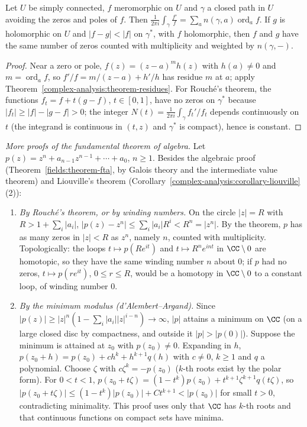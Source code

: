 \begin{theorem}\label{complex-analysis:theorem-argument-principle}
Let $U$ be simply connected, $f$ meromorphic on $U$ and $\gamma$ a closed path in $U$ avoiding the zeros and poles of $f$. Then
$\frac{1}{2\pi i}\int_\gamma\frac{f'}{f} = \sum_a n(\gamma, a)\operatorname{ord}_af$. If $g$ is holomorphic on $U$ and $|f - g| < |f|$ on $\gamma^*$, with $f$ holomorphic, then $f$ and $g$ have the same number of
zeros counted with multiplicity and weighted by $n(\gamma, -)$.
\end{theorem}

\begin{proof}
Near a zero or pole, $f(z) = (z - a)^{m}h(z)$ with $h(a) \neq 0$ and $m = \operatorname{ord}_af$, so $f'/f = m/(z - a) + h'/h$ has residue $m$ at $a$; apply
Theorem~\ref{complex-analysis:theorem-residues}. For Rouch\'e's theorem, the functions $f_t = f + t(g - f)$, $t \in [0, 1]$, have no zeros on $\gamma^*$ because $|f_t| \geq |f| - |g - f| > 0$; the integer
$N(t) = \frac{1}{2\pi i}\int_\gamma f_t'/f_t$ depends continuously on $t$ (the integrand is continuous in $(t, z)$ and $\gamma^*$ is compact), hence is constant.
\end{proof}

\begin{example}\label{complex-analysis:example-fta-proofs}
\emph{More proofs of the fundamental theorem of algebra.} Let $p(z) = z^n + a_{n-1}z^{n-1} + \cdots + a_0$, $n \geq 1$. Besides the algebraic proof (Theorem~\ref{fields:theorem-fta}, by Galois theory and the
intermediate value theorem) and Liouville's theorem (Corollary~\ref{complex-analysis:corollary-liouville}(2)):
\begin{enumerate}
\item \emph{By Rouch\'e's theorem, or by winding numbers.} On the circle $|z| = R$ with $R > 1 + \sum_i|a_i|$, $|p(z) - z^n| \leq \sum_i|a_i|R^i < R^n = |z^n|$. By the theorem, $p$ has as many zeros in
$|z| < R$ as $z^n$, namely $n$, counted with multiplicity. Topologically: the loops $t \mapsto p(Re^{it})$ and $t \mapsto R^ne^{int}$ in $\CC \setminus 0$ are homotopic, so they have the same winding
number $n$ about $0$; if $p$ had no zeros, $t \mapsto p(re^{it})$, $0 \leq r \leq R$, would be a homotopy in $\CC \setminus 0$ to a constant loop, of winding number $0$.
\item \emph{By the minimum modulus (d'Alembert--Argand).} Since $|p(z)| \geq |z|^n(1 - \sum_i|a_i||z|^{i-n}) \to \infty$, $|p|$ attains a minimum on $\CC$ (on a large closed disc by compactness, and outside it
$|p| > |p(0)|$). Suppose the minimum is attained at $z_0$ with $p(z_0) \neq 0$. Expanding in $h$, $p(z_0 + h) = p(z_0) + ch^k + h^{k+1}q(h)$ with $c \neq 0$, $k \geq 1$ and $q$ a polynomial. Choose
$\zeta$ with $c\zeta^k = -p(z_0)$ ($k$-th roots exist by the polar form). For $0 < t < 1$, $p(z_0 + t\zeta) = (1 - t^k)p(z_0) + t^{k+1}\zeta^{k+1}q(t\zeta)$, so
$|p(z_0 + t\zeta)| \leq (1 - t^k)|p(z_0)| + Ct^{k+1} < |p(z_0)|$ for small $t > 0$, contradicting minimality. This proof uses only that $\CC$ has $k$-th roots and that continuous functions on compact sets have
minima.
\end{enumerate}
\end{example}

